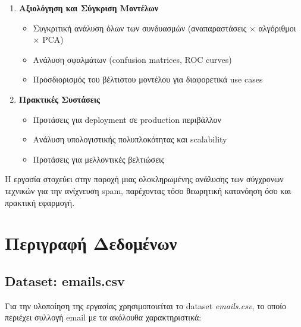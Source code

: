 \documentclass[12pt,a4paper,twoside]{book}
\begin{document}
\begin{enumerate}
    \item \textbf{Αξιολόγηση και Σύγκριση Μοντέλων}
          \begin{itemize}
              \item Συγκριτική ανάλυση όλων των συνδυασμών (αναπαραστάσεις × αλγόριθμοι × PCA)
              \item Ανάλυση σφαλμάτων (confusion matrices, ROC curves)
              \item Προσδιορισμός του βέλτιστου μοντέλου για διαφορετικά use cases
          \end{itemize}

    \item \textbf{Πρακτικές Συστάσεις}
          \begin{itemize}
              \item Προτάσεις για deployment σε production περιβάλλον
              \item Ανάλυση υπολογιστικής πολυπλοκότητας και scalability
              \item Προτάσεις για μελλοντικές βελτιώσεις
          \end{itemize}
\end{enumerate}

Η εργασία στοχεύει στην παροχή μιας ολοκληρωμένης ανάλυσης των σύγχρονων τεχνικών για την ανίχνευση spam, παρέχοντας τόσο θεωρητική κατανόηση όσο και πρακτική εφαρμογή.

\section{Περιγραφή Δεδομένων}

\subsection{Dataset: emails.csv}

Για την υλοποίηση της εργασίας χρησιμοποιείται το dataset \textit{emails.csv}, το οποίο περιέχει συλλογή email με τα ακόλουθα χαρακτηριστικά:
\end{document}

